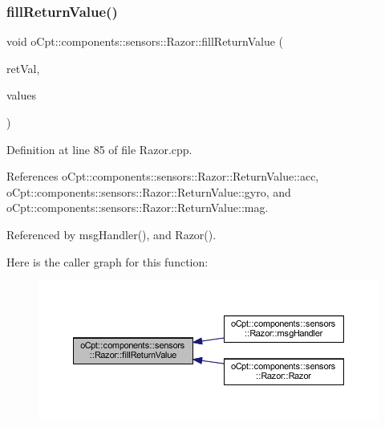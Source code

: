 \subsubsection{\texorpdfstring{fill\+Return\+Value()}{fillReturnValue()}}
{\footnotesize\ttfamily void o\+Cpt\+::components\+::sensors\+::\+Razor\+::fill\+Return\+Value (\begin{DoxyParamCaption}\item[{\hyperlink{classo_cpt_1_1components_1_1sensors_1_1_razor_aab55c5b1a96ce97421e4696599549954}{Razor\+::\+Return\+Value\+\_\+t} \&}]{ret\+Val,  }\item[{float $\ast$}]{values }\end{DoxyParamCaption})\hspace{0.3cm}{\ttfamily [private]}}



Definition at line 85 of file Razor.\+cpp.



References o\+Cpt\+::components\+::sensors\+::\+Razor\+::\+Return\+Value\+::acc, o\+Cpt\+::components\+::sensors\+::\+Razor\+::\+Return\+Value\+::gyro, and o\+Cpt\+::components\+::sensors\+::\+Razor\+::\+Return\+Value\+::mag.



Referenced by msg\+Handler(), and Razor().

Here is the caller graph for this function\+:
\nopagebreak
\begin{figure}[H]
\begin{center}
\leavevmode
\includegraphics[width=350pt]{classo_cpt_1_1components_1_1sensors_1_1_razor_a1c058bfc9483cfcf94456d498bff380e_icgraph}
\end{center}
\end{figure}
\hypertarget{classo_cpt_1_1components_1_1sensors_1_1_razor_aefaf1327348e3e3b9717c40d7aa741c2}{}\label{classo_cpt_1_1components_1_1sensors_1_1_razor_aefaf1327348e3e3b9717c40d7aa741c2} 
